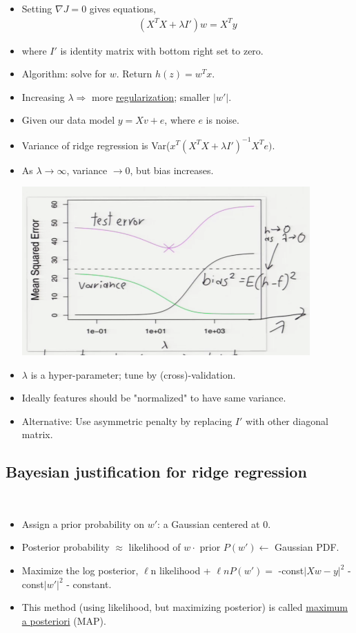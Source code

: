 \documentclass[10pt]{article}
\begin{document}
\begin{itemize}
\begin{center}
			\end{center}
		\item Setting $\nabla J = 0$ gives equations,
			\begin{align*}
				(X^{T}X + \lambda I')w = X^{T}y
			\end{align*} 
		\item where $I'$ is identity matrix with bottom right set to zero.
		\item Algorithm: solve for $w$. Return $h(z) = w^{T}x$.
		\item Increasing $\lambda \Rightarrow$ more \underline{regularization}; smaller $|w'|$.
		\item Given our data model $y = Xv + e$, where $e$ is noise.
		\item Variance of ridge regression is Var($x^{T}(X^{T}X + \lambda I')^{-1}X^{T}e)$.
		\item As $\lambda \rightarrow \infty$, variance $\rightarrow 0$, but bias increases.
			\begin{center}
				\includegraphics[scale=0.5]{../images/lambdabiasvsvariance}
			\end{center}
		\item $\lambda$ is a hyper-parameter; tune by (cross)-validation.
		\item Ideally features should be "normalized" to have same variance.
		\item Alternative: Use asymmetric penalty by replacing $I'$ with other diagonal matrix.
	\end{itemize} 
	
	\subsection*{Bayesian justification for ridge regression}
	\
	\begin{itemize}
		\item Assign a prior probability on $w'$: a Gaussian centered at 0.
		\item Posterior probability $\approx$ likelihood of $w \cdot $ prior $P(w') \leftarrow$ Gaussian PDF. 
		\item Maximize the log posterior, $\ell$n likelihood + $\ell n P(w') =$ -const$|Xw-y|^{2}$ - const$|w'|^{2}$ - constant.
		\item This method (using likelihood, but maximizing posterior) is called \underline{maximum a posteriori} (MAP).
	\end{itemize}
	
\end{document}
